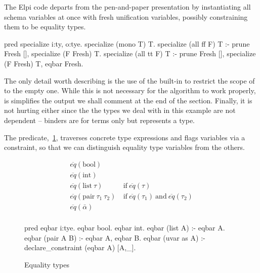 \documentclass[a4paper, 11pt]{book}
\begin{document}
The Elpi code departs from the pen-and-paper presentation by instantiating all
schema variables at once with fresh unification variables, possibly
constraining them to be equality types.

\begin{elpicode}
pred specialize i:ty, o:tye.
specialize (mono T) T.
specialize (all ff F) T :-
  prune Fresh [], specialize (F Fresh) T.
specialize (all tt F) T :-
  prune Fresh [], specialize (F Fresh) T, eqbar Fresh.
\end{elpicode}

\noindent
The only detail worth describing is the use of the  built-in
to restrict the scope of  to the empty one. While this is not
necessary for the algorithm to work properly, is simplifies the output
we shall comment at the end of the section. Finally, it is not hurting either
since the the types we deal with in this example are not dependent -- binders
are for terms only but  represents a type.

The  predicate,~\cref{fig:eqbar}, traverses concrete type expressions and
flags variables via a constraint, so that we can distinguish
equality type variables from the others.

\begin{figure}[!h]
\begin{minipage}{0.5\textwidth}
$$
\begin{array}{ll}
  \overline{eq}(\mbox{bool}) & \\
  \overline{eq}(\mbox{int}) & \\
  \overline{eq}(\mbox{list}~\tau) & ~\mbox{if}~ \overline{eq}(\tau) \\
  \overline{eq}(\mbox{pair}~\tau_1~\tau_2) & ~\mbox{if}~ \overline{eq}(\tau_1) ~\mbox{and}~ \overline{eq}(\tau_2)\\
  \overline{eq}(\bar\alpha) & \\
\end{array}
$$
\end{minipage}
\begin{minipage}{0.45\textwidth}
\begin{elpicode}
pred eqbar i:tye.
eqbar bool.
eqbar int.
eqbar (list A) :- eqbar A.
eqbar (pair A B) :- eqbar A, eqbar B.
eqbar (uvar as A) :-
  declare_constraint (eqbar A) [A,_].
\end{elpicode}
\end{minipage}
\caption{Equality types\label{fig:eqbar}}
\end{figure}
\end{document}
